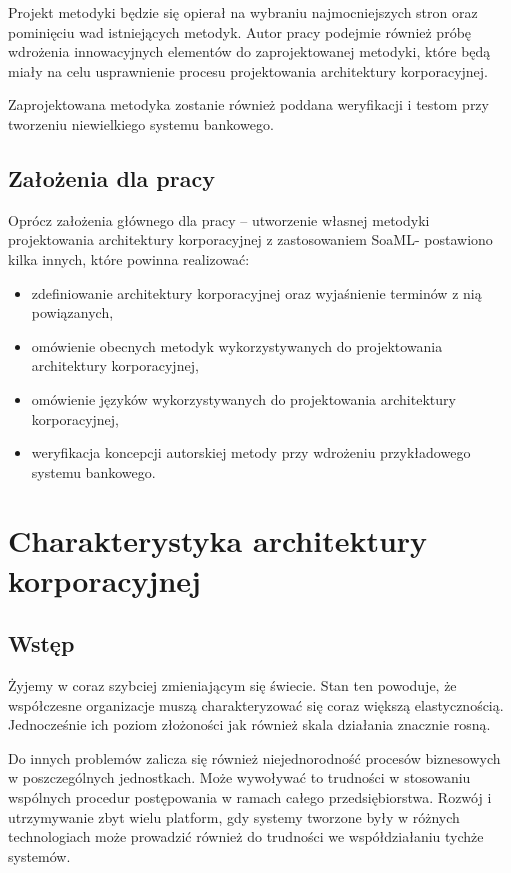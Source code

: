 Projekt metodyki będzie się opierał na wybraniu najmocniejszych stron oraz pominięciu wad istniejących metodyk. Autor pracy podejmie również próbę wdrożenia innowacyjnych elementów do zaprojektowanej metodyki, które będą miały na celu usprawnienie procesu projektowania architektury korporacyjnej.

Zaprojektowana metodyka zostanie również poddana weryfikacji i testom przy tworzeniu niewielkiego systemu bankowego.

\section{Założenia dla pracy}
Oprócz założenia głównego dla pracy – utworzenie własnej metodyki projektowania architektury korporacyjnej z zastosowaniem SoaML- postawiono kilka innych, które powinna realizować:
\begin{itemize}
\item{zdefiniowanie architektury korporacyjnej oraz wyjaśnienie terminów z nią powiązanych,}
\item{omówienie obecnych metodyk wykorzystywanych do projektowania architektury korporacyjnej,}
\item{omówienie języków wykorzystywanych do projektowania architektury korporacyjnej,}
\item{weryfikacja koncepcji autorskiej metody przy wdrożeniu przykładowego systemu bankowego.}
\end{itemize}

\chapter{Charakterystyka architektury korporacyjnej}

\section{Wstęp}
Żyjemy w coraz szybciej zmieniającym się świecie. Stan ten powoduje, że współczesne organizacje muszą charakteryzować się coraz większą elastycznością. Jednocześnie ich poziom złożoności jak również skala działania znacznie rosną.\cite{SobArchKorpDobrPr}

Do innych problemów zalicza się również niejednorodność procesów biznesowych w poszczególnych jednostkach. Może wywoływać to trudności w stosowaniu wspólnych procedur postępowania w ramach całego przedsiębiorstwa. Rozwój i utrzymywanie zbyt wielu platform, gdy systemy tworzone były w różnych technologiach może prowadzić również do trudności we współdziałaniu tychże systemów.

